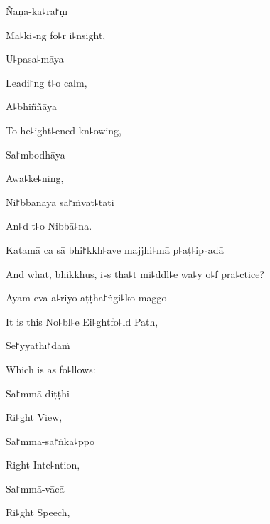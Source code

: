 Ñāṇa-ka꜕ra꜓ṇī

\begin{english}
  Ma꜕ki꜕ng fo꜕r i꜕nsight,
\end{english}

U꜕pasa꜕māya

\begin{english}
  Leadi꜓ng t꜕o calm,
\end{english}

A꜕bhiññāya

\begin{english}
  To he꜕ight꜕ened kn꜕owing,
\end{english}

Sa꜓mbodhāya

\begin{english}
  Awa꜕ke꜕ning,
\end{english}

Ni꜓bbānāya sa꜓ṁvat꜕tati

\begin{english}
  An꜕d t꜕o Nibbā꜕na.
\end{english}

Katamā ca sā bhi꜓kkh꜕ave majjhi꜕mā p꜕aṭ꜕ip꜕adā

\begin{english}
  And what, bhikkhus, i꜕s tha꜕t mi꜕ddl꜕e wa꜕y o꜕f pra꜕ctice?
\end{english}

Ayam-eva a꜕riyo aṭṭha꜓ṅgi꜕ko maggo

\begin{english}
  It is this No꜕bl꜕e Ei꜕ghtfo꜕ld Path,
\end{english}

Se꜓yyathī꜓daṁ

\begin{english}
  Which is as fo꜕llows:
\end{english}

Sa꜓mmā-diṭṭhi

\begin{english}
  Ri꜕ght View,
\end{english}

Sa꜓mmā-sa꜓ṅka꜕ppo

\begin{english}
  Right Inte꜕ntion,
\end{english}

Sa꜓mmā-vācā

\begin{english}
  Ri꜕ght Speech,
\end{english}

